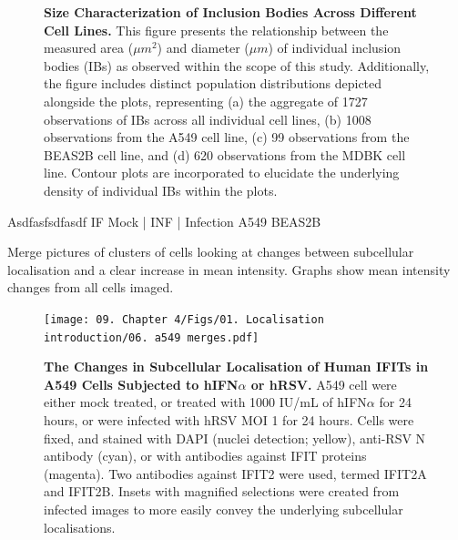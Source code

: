 \begin{figure}
    \caption[Size Characterization of Inclusion Bodies Across Different Cell Lines.]{\textbf{Size Characterization of Inclusion Bodies Across Different Cell Lines.} This figure presents the relationship between the measured area (\(\mu m^2\)) and diameter (\(\mu m\)) of individual inclusion bodies (IBs) as observed within the scope of this study. Additionally, the figure includes distinct population distributions depicted alongside the plots, representing (a) the aggregate of 1727 observations of IBs across all individual cell lines, (b) 1008 observations from the A549 cell line, (c) 99 observations from the BEAS2B cell line, and (d) 620 observations from the MDBK cell line. Contour plots are incorporated to elucidate the underlying density of individual IBs within the plots.}
    \label{fig:Size Characterization of Inclusion Bodies Across Different Cell Lines}
    
\end{figure}


Asdfasfsdfasdf \newline
IF Mock | INF | Infection \newline
A549 BEAS2B

Merge pictures of clusters of cells looking at changes between subcellular localisation and a clear increase in mean intensity. Graphs show mean intensity changes from all cells imaged.

\begin{figure}
    \centering
    \vspace{-15.74707pt}
    \texttt{[image: 09. Chapter 4/Figs/01. Localisation introduction/06. a549 merges.pdf]}
    \caption[The Changes in Subcellular Localisation of Human IFITs in A549 Cells Subjected to hIFN\(\alpha\) or hRSV.]{\textbf{The Changes in Subcellular Localisation of Human IFITs in A549 Cells Subjected to hIFN\(\alpha\) or hRSV.} A549 cell were either mock treated, or treated with 1000 IU/mL of hIFN\(\alpha\) for 24 hours, or were infected with hRSV MOI 1 for 24 hours. Cells were fixed, and stained with DAPI (nuclei detection; yellow), anti-RSV N antibody (cyan), or with antibodies against IFIT proteins (magenta). Two antibodies against IFIT2 were used, termed IFIT2A and IFIT2B. Insets with magnified selections were created from infected images to more easily convey the underlying subcellular localisations.}
    \label{fig:The Changes in Subcellular Localisation of Human IFITs in A549 Cells Subjected to hIFN\(\alpha\) or hRSV.}
\end{figure}

